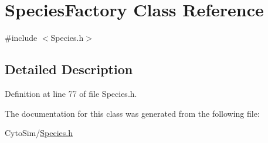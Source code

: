 \hypertarget{classSpeciesFactory}{\section{Species\-Factory Class Reference}
\label{classSpeciesFactory}
}


{\ttfamily \#include $<$Species.\-h$>$}



\subsection{Detailed Description}


Definition at line 77 of file Species.\-h.



The documentation for this class was generated from the following file\-:\begin{DoxyCompactItemize}
\item 
Cyto\-Sim/\hyperlink{Species_8h}{Species.\-h}\end{DoxyCompactItemize}

